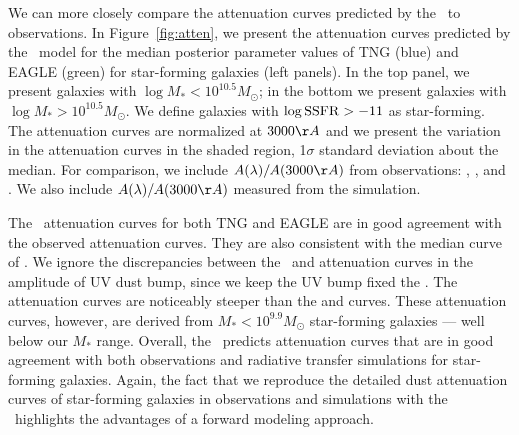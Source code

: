 We can more closely compare the attenuation curves predicted by the \eda~to 
observations. In Figure~\ref{fig:atten}, we present the attenuation curves
predicted by the \eda~model for the median posterior parameter values of TNG
(blue) and EAGLE (green) for star-forming galaxies (left panels). In the top panel, we
present galaxies with $\log M_* < 10^{10.5} M_\odot$; in the bottom we present 
galaxies with $\log M_* > 10^{10.5} M_\odot$. We define galaxies with 
$\log {\rm SSFR} > -11$ as star-forming. The attenuation curves are normalized at
$3000\AA$ and we present the variation in the attenuation curves in the shaded
region, 1$\sigma$ standard deviation about the median. For comparison,
we include $A(\lambda)/A(3000\AA)$ from observations: \cite{calzetti2000},
\cite{battisti2017}, and \cite{salim2018}. We also include $A(\lambda)/A(3000\AA)$
measured from the \cite{narayanan2018} simulation. 

The \eda~attenuation curves for both TNG and EAGLE are in good agreement with the
observed \cite{salim2018} attenuation curves. They are also consistent with the
median curve of \cite{narayanan2018}. We ignore the discrepancies between the
\eda~and \cite{narayanan2018} attenuation curves in the amplitude of UV dust
bump, since we keep the UV bump fixed the \eda. The \eda attenuation curves are
noticeably steeper than the \cite{calzetti2000} and \cite{battisti2017} curves. 
These attenuation curves, however, are derived from $M_* < 10^{9.9}M_\odot$ 
star-forming galaxies --- well below our $M_*$ range. %
Overall, the \eda~predicts attenuation curves that are in good agreement with 
both observations and radiative transfer simulations for star-forming galaxies. 
Again, the fact that we reproduce the detailed dust attenuation curves of star-forming 
galaxies in observations and simulations with the \eda~highlights the
advantages of a forward modeling approach. 

